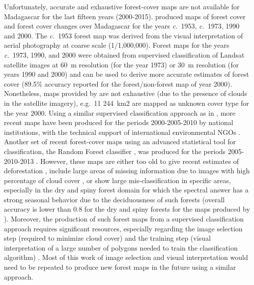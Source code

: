 \documentclass[a4paper, 12pt, leqno]{article} %
\begin{document}
Unfortunately, accurate and exhaustive forest-cover maps are not
available for Madagascar for the last fifteen years (2000-2015).
\citet{Harper2007} produced maps of forest cover and forest cover
changes over Madagascar for the years \emph{c.}~1953, \emph{c.}~1973,
1990 and 2000. The \emph{c.}~1953 forest map was derived from the
visual interpretation of aerial photography at coarse scale
(1/1,000,000). Forest maps for the years \emph{c.}~1973, 1990, and
2000 were obtained from supervised classification of Landsat satellite
images at 60~m resolution (for the year 1973) or 30~m resolution (for
years 1990 and 2000) and can be used to derive more accurate estimates
of forest cover (89.5\% accuracy reported for the forest/non-forest
map of year 2000). Nonetheless, maps provided by \citet{Harper2007}
are not exhaustive (due to the presence of clouds in the satellite
imagery), e.g.~11 244~km2 are mapped as unknown cover type for the
year 2000. Using a similar supervised classification approach as in
\citet{Harper2007}, more recent maps have been produced for the
periods 2000-2005-2010 by national institutions, with the technical
support of international environmental NGOs \citep{MEFT2009,
  ONE2013}. Another set of recent forest-cover maps using an advanced
statistical tool for classification, the Random Forest classifier
\citep{Grinand2013, Rakotomalala2015}, was produced for the periods
2005-2010-2013 \citep{ONE2015}. However, these maps are either too old
to give recent estimates of deforestation \citep{MEFT2009, ONE2013},
include large areas of missing information due to images with high
percentage of cloud cover \citep{ONE2013}, or show large
mis-classification in specific areas, especially in the dry and spiny
forest domain for which the spectral answer has a strong seasonal
behavior due to the deciduousness of such forests (overall accuracy is
lower than 0.8 for the dry and spiny forests for the maps produced by
\citet{ONE2015}). Moreover, the production of such forest maps from a
supervised classification approach requires significant resources,
especially regarding the image selection step (required to minimize
cloud cover) and the training step (visual interpretation of a large
number of polygons needed to train the classification algorithm)
\citep{Rakotomalala2015}. Most of this work of image selection and
visual interpretation would need to be repeated to produce new forest
maps in the future using a similar approach.
\end{document}
